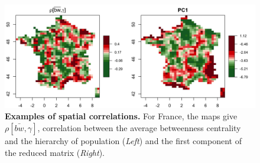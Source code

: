 \begin{figure}
\includegraphics[width=\linewidth]{figures/4-1-3-fig-staticcorrs-mapscorrs}
\caption{\textbf{Examples of spatial correlations.} For France, the maps give $\rho\left[\bar{bw},\gamma\right]$, correlation between the average betweenness centrality and the hierarchy of population (\textit{Left}) and the first component of the reduced matrix (\textit{Right}).\label{fig:staticcorrs:mapscorrs}}
\end{figure}


